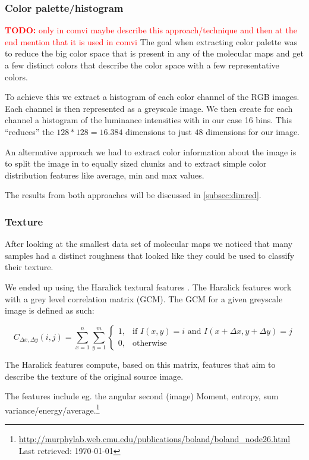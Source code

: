 \documentclass[journal]{vgtc}       %
\newcommand{\todo}[1]{\textcolor{red}{\textbf{TODO:} #1}}
\begin{document}
\subsubsection{Color palette/histogram }

\todo{only in comvi maybe describe this approach/technique and then at the end mention that it is used in comvi}
The goal when extracting color palette was to reduce the big color space that is present in any of the molecular maps and get a few distinct  colors that describe the color space with a few representative colors.

To achieve this we extract a histogram of each color channel of the RGB images. Each channel is then represented as a greyscale image. We then create for each channel a histogram of the luminance intensities with in our case 16 bins. This ``reduces'' the \(128*128 = 16.384\) dimensions to just \(48\) dimensions for our image.

An alternative approach we had to extract color information about the image is to split the image in to equally sized chunks and to extract simple color distribution features like average, min and max values.

The results from both approaches will be discussed in \ref{subsec:dimred}.

\subsubsection{Texture}
After looking at the smallest data set of molecular maps we noticed that many samples had a distinct roughness that looked like they could be used to classify their texture.

We ended up using the Haralick textural features \cite{haralick}  . The Haralick features work with a grey level correlation matrix (GCM). The GCM for a given greyscale image is defined as such:

\[{\displaystyle C_{\Delta x,\Delta y}(i,j)=\sum _{x=1}^{n}\sum _{y=1}^{m}{\begin{cases}1,&{\text{if }}I(x,y)=i{\text{ and }}I(x+\Delta x,y+\Delta y)=j\\0,&{\text{otherwise}}\end{cases}}}\]

The Haralick features compute, based on this matrix, features that aim to describe the texture of the original source image.

The features include eg. the angular second (image) Moment, entropy, sum variance/energy/average.\footnote{\url{http://murphylab.web.cmu.edu/publications/boland/boland_node26.html} \\ Last retrieved: \today}
\end{document}
